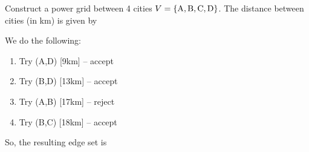

Construct a power grid between 4 cities $V=\{ {\rm A},{\rm B},{\rm C},{\rm D}\}$. The distance between cities (in km) is given by
  

\solution
We do the following:
\begin{enumerate}[label=\arabic*.]
\item Try (A,D) [9km] -- accept
\item Try (B,D) [13km] -- accept
\item Try (A,B) [17km] -- reject
\item Try (B,C) [18km] -- accept  
\end{enumerate}
So, the resulting edge set is 


